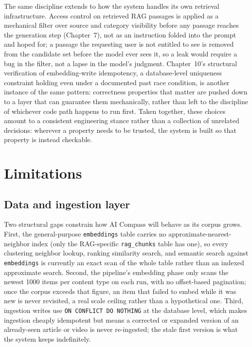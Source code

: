 The same discipline extends to how the system handles its own retrieval infrastructure. Access control on retrieved RAG passages is applied as a mechanical filter over source and category visibility before any passage reaches the generation step (Chapter~7), not as an instruction folded into the prompt and hoped for; a passage the requesting user is not entitled to see is removed from the candidate set before the model ever sees it, so a leak would require a bug in the filter, not a lapse in the model's judgment. Chapter~10's structural verification of embedding-write idempotency, a database-level uniqueness constraint holding even under a documented past race condition, is another instance of the same pattern: correctness properties that matter are pushed down to a layer that can guarantee them mechanically, rather than left to the discipline of whichever code path happens to run first. Taken together, these choices amount to a consistent engineering stance rather than a collection of unrelated decisions: wherever a property needs to be trusted, the system is built so that property is instead checkable.

\section{Limitations}
\label{sec:disc-limitations}

\subsection{Data and ingestion layer}
\label{sec:disc-lim-data}

Two structural gaps constrain how AI Compass will behave as its corpus grows. First, the general-purpose \texttt{embeddings} table carries no approximate-nearest-neighbor index (only the RAG-specific \texttt{rag\_chunks} table has one), so every clustering neighbor lookup, ranking similarity search, and semantic search against \texttt{embeddings} is currently an exact scan of the whole table rather than an indexed approximate search. Second, the pipeline's embedding phase only scans the newest 1000 items per content type on each run, with no offset-based pagination; once the corpus exceeds that figure, an item that failed to embed while it was new is never revisited, a real scale ceiling rather than a hypothetical one. Third, ingestion writes use \texttt{ON CONFLICT DO NOTHING} at the database level, which makes ingestion cheaply idempotent but means a corrected or expanded version of an already-seen article or video is never re-ingested; the stale first version is what the system keeps indefinitely.

